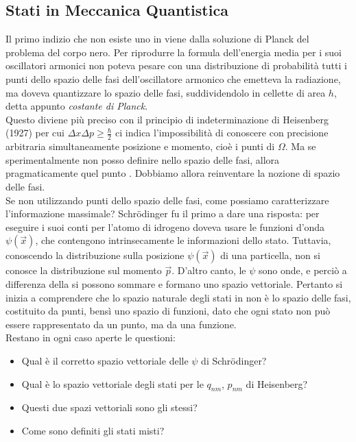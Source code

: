 \documentclass[FisicaTeorica.tex]{subfiles}
\begin{document}
\subsection{Stati in Meccanica Quantistica}
Il primo indizio che non esiste uno  in \MQ viene dalla soluzione di Planck del problema del corpo nero. Per riprodurre la formula dell'energia media per i suoi oscillatori armonici non poteva pesare con una distribuzione di probabilità tutti i punti dello spazio delle fasi dell'oscillatore armonico che emetteva la radiazione, ma doveva quantizzare lo spazio delle fasi, suddividendolo in cellette di area $h$, detta appunto \emph{costante di Planck}.\\ 
Questo diviene più preciso con il principio di indeterminazione di Heisenberg (1927) per cui 
$\Delta x \Delta p\geq \frac{\hbar}{2}$ ci indica l'impossibilità di conoscere con precisione arbitraria simultaneamente posizione e momento, cioè i punti di $\Omega$. Ma se sperimentalmente non posso definire  nello spazio delle fasi, allora pragmaticamente quel punto . Dobbiamo allora reinventare la nozione di spazio delle fasi.\\
Se non utilizzando punti dello spazio delle fasi, come possiamo caratterizzare l'informazione massimale?
Schrödinger fu il primo a dare una risposta: per eseguire i suoi conti per l'atomo di idrogeno doveva usare le funzioni d'onda $\psi(\vec{x})$, che contengono intrinsecamente le informazioni dello stato.
Tuttavia, conoscendo la distribuzione sulla posizione $\psi(\vec{x})$ di una particella, non si conosce la distribuzione sul momento $\vec{p}$. D'altro canto, le $\psi$ sono onde, e perciò a differenza della \MC si possono sommare e formano uno spazio vettoriale. Pertanto si inizia a comprendere che lo spazio naturale degli stati in \MQ non è lo spazio delle fasi, costituito da punti, bensì uno spazio di funzioni, dato che ogni stato non può essere rappresentato da un punto, ma da una funzione. \\
Restano in ogni caso aperte le questioni:
\begin{itemize}
    \item Qual è il corretto spazio vettoriale delle $\psi$ di Schrödinger?
    \item Qual è lo spazio vettoriale degli stati per le $q_{nm}$, $p_{nm}$ di Heisenberg?
    \item Questi due spazi vettoriali sono gli stessi?
    \item Come sono definiti gli stati misti? 
\end{itemize}
\end{document}
